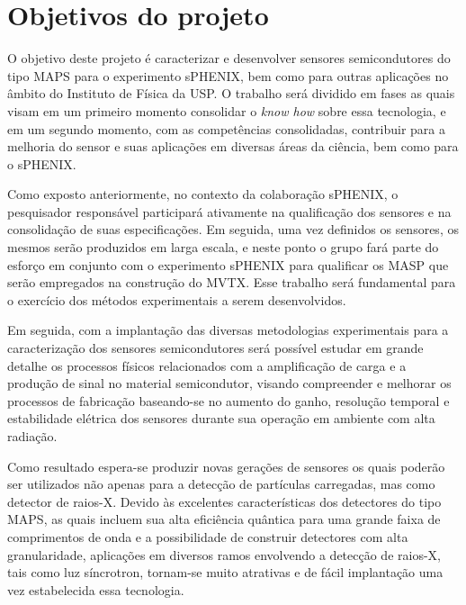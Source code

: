 \chapter{Objetivos do projeto}

O objetivo deste projeto é caracterizar e desenvolver sensores semicondutores do tipo MAPS para o experimento sPHENIX, bem como para outras aplicações no âmbito do Instituto de Física da USP. O trabalho será dividido em fases as quais visam em um primeiro momento consolidar o {\it know how} sobre essa tecnologia, e em um segundo momento, com as competências consolidadas, contribuir para a melhoria do sensor e suas aplicações em diversas áreas da ciência, bem como para o sPHENIX.

Como exposto anteriormente, no contexto da colaboração sPHENIX, o pesquisador responsável participará ativamente na qualificação dos sensores e na consolidação de suas especificações. Em seguida, uma vez definidos os sensores, os mesmos serão produzidos em larga escala, e neste ponto o grupo fará parte do esforço em conjunto com o experimento sPHENIX para qualificar os MASP que serão empregados na construção do MVTX. Esse trabalho será fundamental para o exercício dos métodos experimentais a serem desenvolvidos.

Em seguida, com a implantação das diversas metodologias experimentais para a caracterização dos sensores semicondutores será possível estudar em grande detalhe os processos físicos relacionados com a amplificação de carga e a produção de sinal no material semicondutor, visando compreender e melhorar os processos de fabricação baseando-se no aumento do ganho, resolução temporal e estabilidade elétrica dos sensores durante sua operação em ambiente com alta radiação. 

Como resultado espera-se produzir novas gerações de sensores os quais poderão ser utilizados não apenas para a detecção de partículas carregadas, mas como detector de raios-X. Devido às excelentes características dos detectores do tipo MAPS, as quais incluem sua alta eficiência quântica para uma grande faixa de comprimentos de onda e a possibilidade de construir detectores com alta granularidade, aplicações em diversos ramos envolvendo a detecção de raios-X, tais como luz síncrotron, tornam-se muito atrativas e de fácil implantação uma vez estabelecida essa tecnologia.

